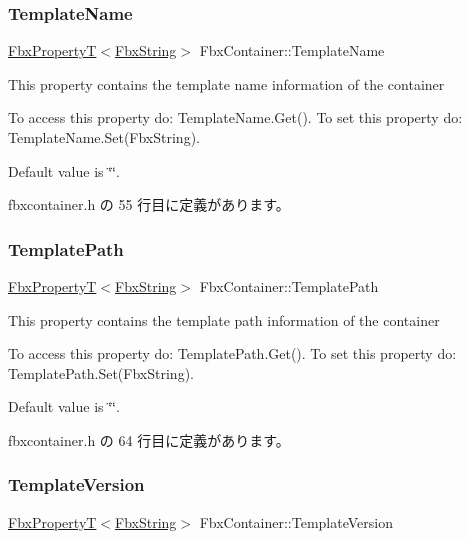 \subsubsection{\texorpdfstring{Template\+Name}{TemplateName}}
{\footnotesize\ttfamily \hyperlink{class_fbx_property_t}{Fbx\+PropertyT}$<$\hyperlink{class_fbx_string}{Fbx\+String}$>$ Fbx\+Container\+::\+Template\+Name}

This property contains the template name information of the container

To access this property do\+: Template\+Name.\+Get(). To set this property do\+: Template\+Name.\+Set(\+Fbx\+String).

Default value is \char`\"{}\char`\"{}. 

 fbxcontainer.\+h の 55 行目に定義があります。

\mbox{\label{class_fbx_container_a8d66563e359fda83e5b67017140e97d1}} 
\subsubsection{\texorpdfstring{Template\+Path}{TemplatePath}}
{\footnotesize\ttfamily \hyperlink{class_fbx_property_t}{Fbx\+PropertyT}$<$\hyperlink{class_fbx_string}{Fbx\+String}$>$ Fbx\+Container\+::\+Template\+Path}

This property contains the template path information of the container

To access this property do\+: Template\+Path.\+Get(). To set this property do\+: Template\+Path.\+Set(\+Fbx\+String).

Default value is \char`\"{}\char`\"{}. 

 fbxcontainer.\+h の 64 行目に定義があります。

\mbox{\label{class_fbx_container_a0fcd3f02b0b9df51cfd82902c794e709}} 
\subsubsection{\texorpdfstring{Template\+Version}{TemplateVersion}}
{\footnotesize\ttfamily \hyperlink{class_fbx_property_t}{Fbx\+PropertyT}$<$\hyperlink{class_fbx_string}{Fbx\+String}$>$ Fbx\+Container\+::\+Template\+Version}

